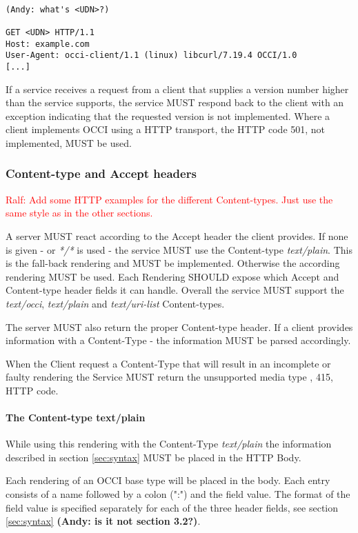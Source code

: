 \documentclass[10pt,a4paper]{article}
\newcommand{\ralf}[1]{\textcolor{red}{Ralf: #1}}
\begin{document}
\begin{verbatim}

(Andy: what's <UDN>?)

GET <UDN> HTTP/1.1
Host: example.com
User-Agent: occi-client/1.1 (linux) libcurl/7.19.4 OCCI/1.0
[...]
\end{verbatim}

If a service receives a request from a client that supplies a version
number higher than the service supports, the service MUST respond back
to the client with an exception indicating that the requested version
is not implemented. Where a client implements OCCI using a HTTP
transport, the HTTP code 501, not implemented, MUST be used.

\subsubsection{Content-type and Accept headers}
\ralf{Add some HTTP examples for the different Content-types. Just use the same
style as in the other sections.}

A server MUST react according to the Accept header the client
provides. If none is given - or \textit{*/*} is used - the service MUST
use the Content-type \emph{text/plain}. This is the fall-back
rendering and MUST be implemented. Otherwise the according rendering
MUST be used. Each Rendering SHOULD expose which Accept and
Content-type header fields it can handle. Overall the service MUST
support the \textit{text/occi}, \textit{text/plain} and
\textit{text/uri-list} Content-types.

The server MUST also return the proper Content-type header. If a
client provides information with a Content-Type - the information MUST
be parsed accordingly.

When the Client request a Content-Type that will result in an
incomplete or faulty rendering the Service MUST return the unsupported media type
, 415, HTTP code.

\paragraph{The Content-type text/plain}
While using this rendering with the Content-Type \textit{text/plain}
the information described in section \ref{sec:syntax} MUST be placed
in the HTTP Body.

Each rendering of an OCCI base type will be placed in the body. Each
entry consists of a name followed by a colon (":") and the field
value. The format of the field value is specified separately for each
of the three header fields, see section \ref{sec:syntax} \textbf{(Andy: is it not section 3.2?)}.
\end{document}
